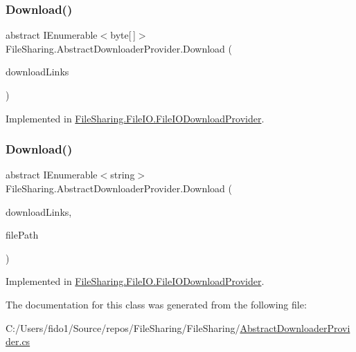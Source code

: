 \subsubsection{\texorpdfstring{Download()}{Download()}\hspace{0.1cm}{\footnotesize\ttfamily [1/2]}}
{\footnotesize\ttfamily abstract I\+Enumerable$<$byte\mbox{[}$\,$\mbox{]}$>$ File\+Sharing.\+Abstract\+Downloader\+Provider.\+Download (\begin{DoxyParamCaption}\item[{I\+Enumerable$<$ string $>$}]{download\+Links }\end{DoxyParamCaption})\hspace{0.3cm}{\ttfamily [pure virtual]}}



Implemented in \hyperlink{class_file_sharing_1_1_file_i_o_1_1_file_i_o_download_provider_a0ff0bb3a458f9caa2daa5dc035b07c11}{File\+Sharing.\+File\+I\+O.\+File\+I\+O\+Download\+Provider}.

\mbox{\label{class_file_sharing_1_1_abstract_downloader_provider_ada4a19b16867bad02c79f09072f69b84}} 
\subsubsection{\texorpdfstring{Download()}{Download()}\hspace{0.1cm}{\footnotesize\ttfamily [2/2]}}
{\footnotesize\ttfamily abstract I\+Enumerable$<$string$>$ File\+Sharing.\+Abstract\+Downloader\+Provider.\+Download (\begin{DoxyParamCaption}\item[{I\+Enumerable$<$ string $>$}]{download\+Links,  }\item[{string}]{file\+Path }\end{DoxyParamCaption})\hspace{0.3cm}{\ttfamily [pure virtual]}}



Implemented in \hyperlink{class_file_sharing_1_1_file_i_o_1_1_file_i_o_download_provider_a8852368c5ed43e3f30def0df9f11841c}{File\+Sharing.\+File\+I\+O.\+File\+I\+O\+Download\+Provider}.



The documentation for this class was generated from the following file\+:\begin{DoxyCompactItemize}
\item 
C\+:/\+Users/fido1/\+Source/repos/\+File\+Sharing/\+File\+Sharing/\hyperlink{_abstract_downloader_provider_8cs}{Abstract\+Downloader\+Provider.\+cs}\end{DoxyCompactItemize}
